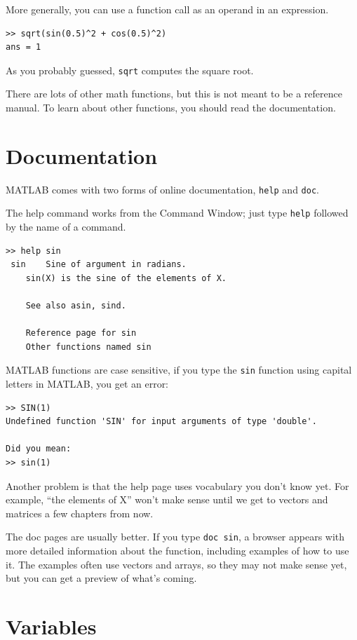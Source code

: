 \documentclass{book}
\begin{document}
More generally, you can use a function call as an operand in an expression.

\begin{verbatim}
>> sqrt(sin(0.5)^2 + cos(0.5)^2)
ans = 1
\end{verbatim}

As you probably guessed, {\tt sqrt} computes the square root.

There are lots of other math functions, but this is not meant to
be a reference manual.  To learn about other functions, you should
read the documentation.


\section{Documentation}

MATLAB comes with two forms of online documentation, {\tt help}
and {\tt doc}.

The help command works from the Command Window; just type {\tt help}
followed by the name of a command.

\begin{verbatim}
>> help sin
 sin    Sine of argument in radians.
    sin(X) is the sine of the elements of X.

    See also asin, sind.

    Reference page for sin
    Other functions named sin
\end{verbatim}

MATLAB functions are case sensitive, if you type the {\tt sin} function using capital letters
in MATLAB, you get an error:

\begin{verbatim}
>> SIN(1)
Undefined function 'SIN' for input arguments of type 'double'.

Did you mean:
>> sin(1)
\end{verbatim}

Another problem is that the help page uses vocabulary you don't
know yet.  For example, ``the elements of X'' won't make sense until
we get to vectors and matrices a few chapters from now.

The doc pages are usually better.  If you type {\tt doc sin}, a
browser appears with more detailed information about the
function, including examples of how to use it.  The examples often
use vectors and arrays, so they may not make sense yet, but you can
get a preview of what's coming.


\section{Variables}
\end{document}
